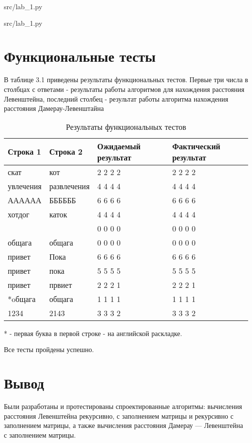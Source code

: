 \begin{lstinputlisting}[language=Python, caption=Матричная реализация (с хранением двух строк) алгоритма поиска расстояния Левенштейна, linerange={49-66}, basicstyle=\small\sffamily, frame=single]{src/lab_1.py}
\end{lstinputlisting}

\begin{lstinputlisting}[language=Python, caption=Рекурсивная реализация (с матрицей) алгоритма поиска расстояния Дамерау-Левенштейна, linerange={67-98}, basicstyle=\small\sffamily, frame=single]{src/lab_1.py}
\end{lstinputlisting}


\clearpage
\section{Функциональные тесты}
В таблице 3.1 приведены результаты функциональных тестов. Первые три числа в столбцах с ответами - результаты работы алгоритмов для нахождения расстояния Левенштейна, последний столбец - результат работы алгоритма нахождения расстояния Дамерау-Левенштайна

\begin{table}[!ht]
  \caption{Результаты функциональных тестов}
  \centering
\begin{tabular}{ | l | l | l | l | }
\hline
Строка 1 & Строка 2 & Ожидаемый результат & Фактический результат \\ \hline
скат & кот & 2 2 2 2 & 2 2 2 2 \\
увлечения & развлечения & 4 4 4 4 & 4 4 4 4\\
АААААА & ББББББ & 6 6 6 6& 6 6 6 6\\
хотдог & каток & 4 4 4 4 & 4 4 4 4\\
 &  & 0 0 0 0 & 0 0 0 0\\
общага & общага & 0 0 0 0 & 0 0 0 0\\
привет & Пока & 6 6 6 6 & 6 6 6 6\\
привет & пока & 5 5 5 5 & 5 5 5 5 \\
привет & првиет & 2 2 2 1 & 2 2 2 1\\
*oбщага & общага & 1 1 1 1 & 1 1 1 1\\
1234 & 2143 & 3 3 3 2 & 3 3 3 2\\
\hline
\end{tabular}
\end{table}

* - первая буква в первой строке - на английской раскладке.

Все тесты пройдены успешно.

\section{Вывод}

Были разработаны и протестированы спроектированные алгоритмы: вычисления расстояния Левенштейна рекурсивно, с заполнением матрицы и рекурсивно с заполнением матрицы, а также вычисления расстояния Дамерау — Левенштейна с заполнением матрицы.
